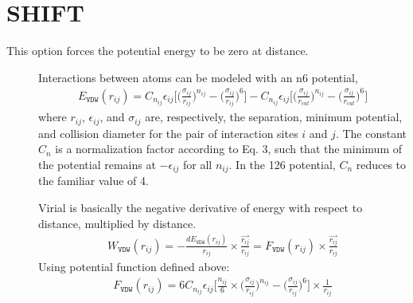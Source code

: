 \documentclass[letterpaper,10pt,english]{sphinxmanual}
\begin{document}
\section{SHIFT}
\label{\detokenize{vdw_energy:shift}}
\sphinxAtStartPar
This option forces the potential energy to be zero at  distance.
\begin{description}
\item[{}] \leavevmode
\sphinxAtStartPar
Interactions between atoms can be modeled with an n\sphinxhyphen{}6 potential,
\begin{equation*}
\begin{split}E_{\texttt{VDW}}(r_{ij}) = C_{n_{ij}} \epsilon_{ij} \bigg[\bigg(\frac{\sigma_{ij}}{r_{ij}}\bigg)^{n_{ij}} - \bigg(\frac{\sigma_{ij}}{r_{ij}}\bigg)^6\bigg] - C_{n_{ij}} \epsilon_{ij} \bigg[\bigg(\frac{\sigma_{ij}}{r_{cut}}\bigg)^{n_{ij}} - \bigg(\frac{\sigma_{ij}}{r_{cut}}\bigg)^6\bigg]\end{split}
\end{equation*}
\sphinxAtStartPar
where \(r_{ij}\), \(\epsilon_{ij}\), and \(\sigma_{ij}\) are, respectively, the separation, minimum potential, and collision diameter for the pair of interaction sites \(i\) and \(j\). The constant \(C_n\) is a normalization factor according to Eq. 3, such that the minimum of the potential remains at \(-\epsilon_{ij}\) for all \(n_{ij}\). In the 12\sphinxhyphen{}6 potential, \(C_n\) reduces to the familiar value of 4.

\item[{}] \leavevmode
\sphinxAtStartPar
Virial is basically the negative derivative of energy with respect to distance, multiplied by distance.
\begin{equation*}
\begin{split}W_{\texttt{VDW}}(r_{ij}) = -\frac{dE_{\texttt{VDW}}(r_{ij})}{r_{ij}}\times \frac{\overrightarrow{r_{ij}}}{{r_{ij}}} = F_{\texttt{VDW}}(r_{ij}) \times \frac{\overrightarrow{r_{ij}}}{{r_{ij}}}\end{split}
\end{equation*}
\sphinxAtStartPar
Using  potential function defined above:
\begin{equation*}
\begin{split}F_{\texttt{VDW}}(r_{ij}) = 6C_{n_{ij}} \epsilon_{ij} \bigg[\frac{n_{ij}}{6} \times \bigg(\frac{\sigma_{ij}}{r_{ij}}\bigg)^{n_{ij}} - \bigg(\frac{\sigma_{ij}}{r_{ij}}\bigg)^6\bigg]\times \frac{1}{{r_{ij}}}\end{split}
\end{equation*}
\begin{figure}[htbp]
\centering
\capstart


\end{figure}
\end{description}
\end{document}
